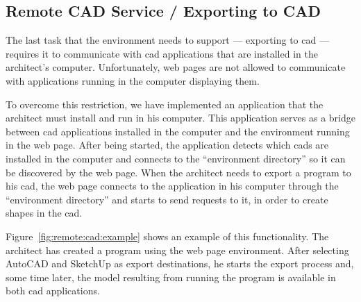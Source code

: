

\subsection{Remote CAD Service / Exporting to CAD}
The last task that the environment needs to support --- exporting to \gls{cad} --- requires it to communicate with \gls{cad} applications that are installed in the architect's computer.
Unfortunately, web pages are not allowed to communicate with applications running in the computer displaying them.

To overcome this restriction, we have implemented an application that the architect must install and run in his computer.
This application serves as a bridge between \gls{cad} applications installed in the computer and the environment running in the web page.
After being started, the application detects which \glspl{cad} are installed in the computer and connects to the ``environment directory'' so it can be discovered by the web page.
When the architect needs to export a program to his \gls{cad}, the web page connects to the application in his computer through the ``environment directory'' and starts to send requests to it, in order to create shapes in the \gls{cad}.

Figure~\ref{fig:remote:cad:example} shows an example of this functionality.
The architect has created a program using the web page environment.
After selecting AutoCAD and SketchUp as export destinations, he starts the export process and, some time later, the model resulting from running the program is available in both \gls{cad} applications.




